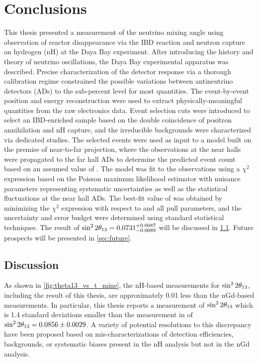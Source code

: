 \chapter{Conclusions}
\label{ch:conclusions}

This thesis presented a measurement of
the neutrino mixing angle \thetaot{}
using observation of reactor \nuebar{} disappearance
via the IBD reaction and neutron capture on hydrogen (nH)
at the Daya Bay experiment.
After introducing the history and theory of neutrino oscillations,
the Daya Bay experimental apparatus was described.
Precise characterization of the detector response
via a thorough calibration regime
constrained the possible variations between antineutrino detectors (ADs)
to the sub-percent level for most quantities.
The event-by-event position and energy reconstruction were used
to extract physically-meaningful quantities from the raw electronics data.
Event selection cuts were introduced to select an IBD-enriched sample
based on the double coincidence of positron annihilation and nH capture,
and the irreducible backgrounds were characterized via dedicated studies.
The selected events were used as input to a model
built on the premise of near-to-far projection,
where the observations at the near halls
were propagated to the far hall ADs
to determine the predicted event count based on an assumed value of \thetaot{}.
The model was fit to the observations using a $\chi^2$ expression
based on the Poisson maximum likelihood estimator
with nuisance parameters representing systematic uncertainties
as well as the statistical fluctuations at the near hall ADs.
The best-fit value of \thetaot{} was obtained by minimizing the $\chi^2$ expression
with respect to \thetaot{} and all pull parameters,
and the uncertainty and error budget were determined
using standard statistical techniques.
The result of $\sin^22\theta_{13} = 0.0731^{+0.0087}_{-0.0089}$
will be discussed in \cref{sec:discussion}.
Future prospects will be presented in \cref{sec:future}.

\section{Discussion}
\label{sec:discussion}

As shown in \cref{fig:theta13_vs_t_mine}, the nH-based measurements for $\sin^22\theta_{13}{}$,
including the result of this thesis, are approximately 0.01
less than the nGd-based measurements.
In particular, this thesis reports a measurement of $\sin^22\theta_{13}$
which is 1.4 standard deviations smaller
than the measurement in \cite{ngd2018} of
$\sin^22\theta_{13} = 0.0856\pm0.0029$.
A variety of potential resolutions to this discrepancy have been proposed
based on mis-characterizations of detection efficiencies, backgrounds,
or systematic biases present in the nH analysis but not in the nGd analysis.

